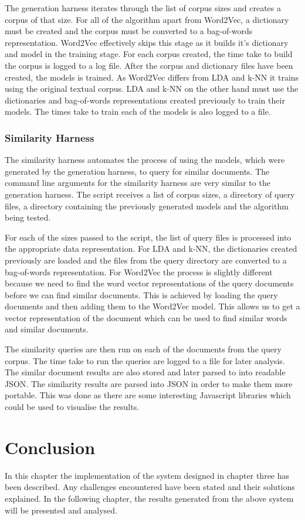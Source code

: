 The generation harness iterates through the list of corpus sizes and creates a corpus of that size.
For all of the algorithm apart from Word2Vec, a dictionary must be created and the corpus must be converted to a bag-of-words representation.
Word2Vec effectively skips this stage as it builds it's dictionary and model in the training stage.
For each corpus created, the time take to build the corpus is logged to a log file.
After the corpus and dictionary files have been created, the models is trained.
As Word2Vec differs from LDA and k-NN it trains using the original textual corpus.
LDA and k-NN on the other hand must use the dictionaries and bag-of-words representations created previously to train their models.
The times take to train each of the models is also logged to a file.

\subsubsection{Similarity Harness}
The similarity harness automates the process of using the models, which were generated by the generation harness, to query for similar documents.
The command line arguments for the similarity harness are very similar to the generation harness.
The script receives a list of corpus sizes, a directory of query files, a directory containing the previously generated models and the algorithm being tested.

For each of the sizes passed to the script, the list of query files is processed into the appropriate data representation.
For LDA and k-NN, the dictionaries created previously are loaded and the files from the query directory are converted to a bag-of-words representation.
For Word2Vec the process is slightly different because we need to find the word vector representations of the query documents before we can find similar documents.
This is achieved by loading the query documents and then adding them to the Word2Vec model.
This allows us to get a vector representation of the document which can be used to find similar words and similar documents.

The similarity queries are then run on each of the documents from the query corpus.
The time take to run the queries are logged to a file for later analysis.
The similar document results are also stored and later parsed to into readable JSON.
The similarity results are parsed into JSON in order to make them more portable.
This was done as there are some interesting Javascript libraries which could be used to visualise the results.

\section{Conclusion}
In this chapter the implementation of the system designed in chapter three has been described.
Any challenges encountered have been stated and their solutions explained.
In the following chapter, the results generated from the above system will be presented and analysed.
